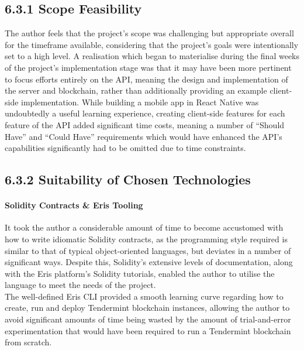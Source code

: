 \documentclass[12pt]{report}
\let\oldparagraph\paragraph
\renewcommand{\paragraph}[1]{\oldparagraph{#1}\mbox{}}
\begin{document}
\subsection{6.3.1 Scope Feasibility}\label{scope-feasibility}

The author feels that the project's scope was challenging but
appropriate overall for the timeframe available, considering that the
project's goals were intentionally set to a high level. A realisation
which began to materialise during the final weeks of the project's
implementation stage was that it may have been more pertinent to focus
efforts entirely on the API, meaning the design and implementation of
the server and blockchain, rather than additionally providing an example
client-side implementation. While building a mobile app in React Native
was undoubtedly a useful learning experience, creating client-side
features for each feature of the API added significant time costs,
meaning a number of ``Should Have'' and ``Could Have'' requirements
which would have enhanced the API's capabilities significantly had to be
omitted due to time constraints.

\subsection{6.3.2 Suitability of Chosen
Technologies}\label{suitability-of-chosen-technologies}

\paragraph{Solidity Contracts \& Eris
Tooling}\label{solidity-contracts-eris-tooling}

It took the author a considerable amount of time to become accustomed
with how to write idiomatic Solidity contracts, as the programming style
required is similar to that of typical object-oriented languages, but
deviates in a number of significant ways. Despite this, Solidity's
extensive levels of documentation, along with the Eris platform's
Solidity tutorials, enabled the author to utilise the language to meet
the needs of the project.\\
The well-defined Eris CLI provided a smooth learning curve regarding how
to create, run and deploy Tendermint blockchain instances, allowing the
author to avoid significant amounts of time being wasted by the amount
of trial-and-error experimentation that would have been required to run
a Tendermint blockchain from scratch.
\end{document}

